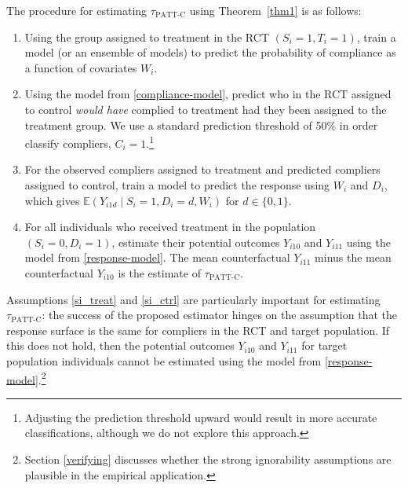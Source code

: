 \documentclass[hidelinks,12pt]{article}
\newcommand{\ex}{\mathbb{E}} %
\begin{document}
{The procedure for estimating $\tau_{\text{PATT-C}}$ using Theorem~\ref{thm1} is as follows:
\begin{enumerate}[label=\textbf{S.\arabic*},ref=S.\arabic*]
\item Using the group assigned to treatment in the RCT $(S_i=1, T_i=1)$, train a model {\color{red}(or an ensemble of models)} to predict {\color{red}the probability of compliance as a function of covariates $W_i$.} \label{compliance-model}
\item Using the model from \ref{compliance-model}, predict who in the RCT assigned to control \textit{would have} complied to treatment had they been assigned to the treatment group. {\color{red} We use a standard prediction threshold of 50\% in order classify compliers, $C_i=1$.\footnote{Adjusting the prediction threshold upward would result in more accurate classifications, although we do not explore this approach.}} \label{complier-predict}
\item {\color{red}For the observed compliers assigned to treatment and predicted compliers assigned to control, train a model to predict the response using $W_i$ and $D_i$, which gives $\ex(Y_{i1d} \mid S_i=1, D_i=d, W_i)$ for $d \in \{0,1\}$.}\label{response-model}
\item For all individuals who received treatment in the population $(S_i=0, D_i=1)$, estimate their potential outcomes $Y_{i10}$ and $Y_{i11}$ using the model from \ref{response-model}. The mean counterfactual $Y_{i11}$ minus the mean counterfactual $Y_{i10}$ is the estimate of $\tau_{\text{PATT-C}}$.\label{response-predict}
\end{enumerate}

Assumptions \ref{si_treat} and \ref{si_ctrl} are particularly important for estimating $\tau_{\text{PATT-C}}$: the success of the proposed estimator hinges on the assumption that the response surface is the same for compliers in the RCT and target population. If this does not hold, then the potential outcomes $Y_{i10}$ and $Y_{i11}$ for target population individuals cannot be estimated using the model from \ref{response-model}.\footnote{{\color{red}Section \ref{verifying} discusses whether the strong ignorability assumptions are plausible in the empirical application.}}

{\color{red}
}}
\end{document}
